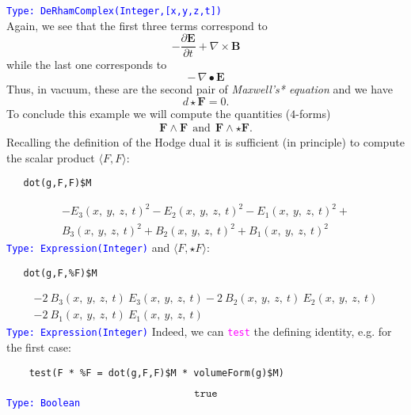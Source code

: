 \documentclass[12pt,a4paper]{article}
\newcommand{\spadfun}[1]{\textcolor{magenta}{\tt #1}}
\newcommand{\type}[1]{\textcolor{blue}{\tt\tiny #1}}
\begin{document}
\type{Type: DeRhamComplex(Integer,[x,y,z,t])}    
\\
Again, we see that the first three terms correspond to
\begin{displaymath}
   -\frac{\partial\mathbf{E}}{\partial t}+ \nabla\times\mathbf{B}
\end{displaymath}
while the last one corresponds to
\begin{displaymath}
 -\,\nabla\bullet\mathbf{E}
\end{displaymath}
Thus, in vacuum, these are the second pair of {\it Maxwell's* equation} and 
we have
\begin{displaymath}
  d \star\mathbf{F} = 0.
\end{displaymath}
To conclude this example we will compute the quantities ($4$-forms)
\begin{eqnarray*}
     \mathbf{F} \wedge \mathbf{F} \ \ \mathrm{and}  \ \
     \mathbf{F} \wedge \star\mathbf{F}.
\end{eqnarray*}
Recalling the definition of the Hodge dual it is sufficient (in principle)
to compute the scalar product $\langle F,F\rangle$:
\begin{lstlisting}
   dot(g,F,F)$M
\end{lstlisting}
\begin{eqnarray*}
    -{{{{E _ {3}}\left({x, \: y, \: z, \: t}\right)}}^ {2}} -{{{{E _ {2}}
    \left({x, \: y, \: z, \: t}\right)}}^ {2}} -{{{{E _ {1}}\left(
    {x, \: y, \: z, \: t}\right)}}^ {2}}+ \\ {{{{B _ {3}}\left(
    {x, \: y, \: z, \: t}\right)}}^ {2}}+{{{{B _ {2}}\left(
    {x, \: y, \: z, \: t}\right)}}^ {2}}+{{{{B _ {1}}\left(
    {x, \: y, \: z, \: t}\right)}}^ {2}}
\end{eqnarray*}
\type{Type: Expression(Integer)}
and $\langle F,\star F\rangle$:
\begin{lstlisting}
   dot(g,F,%F)$M
\end{lstlisting}
\begin{eqnarray*}
    -{2 \  {{B _ {3}}\left({x, \: y, \: z, \: t}\right)}
    \  {{E _ {3}}\left({x, \: y, \: z, \: t}\right)}}
    -{2 \  {{B _ {2}}\left({x, \: y, \: z, \: t}
    \right)}\  {{E _ {2}}\left({x, \: y, \: z, \: t}
    \right)}} \\-{2 \  {{B _ {1}}\left({x, \: y, \: z, \: t}
    \right)}\  {{E _ {1}}\left({x, \: y, \: z, \: t}\right)}}
\end{eqnarray*}
\type{Type: Expression(Integer)}
Indeed, we can \spadfun{test} the defining identity, e.g. for the first case:
\begin{lstlisting}
    test(F * %F = dot(g,F,F)$M * volumeForm(g)$M)
\end{lstlisting}
\begin{displaymath}
   \mathtt{true}
\end{displaymath}
\type{Type: Boolean}
%
\end{document}
